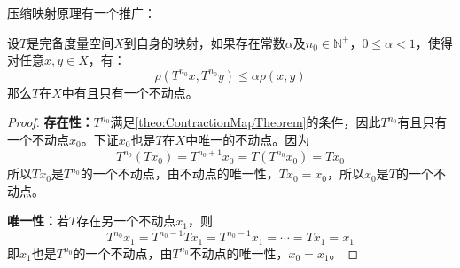 压缩映射原理有一个推广：
\begin{theorem}
	设$T$是完备度量空间$X$到自身的映射，如果存在常数$\alpha$及$n_0\in\mathbb{N}^+$，$0\leqslant\alpha<1$，使得对任意$x,y\in X$，有：
	\begin{equation*}
		\rho(T^{n_0}x,T^{n_0}y)\leqslant\alpha\rho(x,y)
	\end{equation*}
	那么$T$在$X$中有且只有一个不动点。
\end{theorem}
\begin{proof}
	\textbf{存在性：}$T^{n_0}$满足\cref{theo:ContractionMapTheorem}的条件，因此$T^{n_0}$有且只有一个不动点$x_0$。下证$x_0$也是$T$在$X$中唯一的不动点。因为
	\begin{equation*}
		T^{n_0}(Tx_0)=T^{n_0+1}x_0=T(T^{n_0}x_0)=Tx_0
	\end{equation*}
	所以$Tx_0$是$T^{n_0}$的一个不动点，由不动点的唯一性，$Tx_0=x_0$，所以$x_0$是$T$的一个不动点。\par
	\textbf{唯一性：}若$T$存在另一个不动点$x_1$，则
	\begin{equation*}
		T^{n_0}x_1=T^{n_0-1}Tx_1=T^{n_0-1}x_1=\cdots=Tx_1=x_1
	\end{equation*}
	即$x_1$也是$T^{n_0}$的一个不动点，由$T^{n_0}$不动点的唯一性，$x_0=x_1$。
\end{proof}

